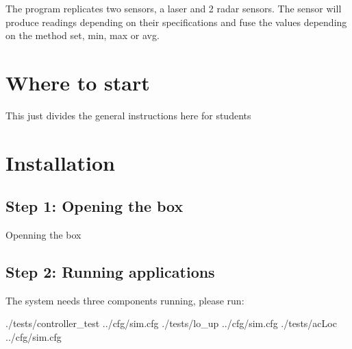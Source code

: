 The program replicates two sensors, a laser and 2 radar sensors. The sensor will produce readings depending on their specifications and fuse the values depending on the method set, min, max or avg.\hypertarget{index_ac_doc_index_more_info}{}\section{Where to start}\label{index_ac_doc_index_more_info}

\begin{DoxyItemize}
\item This just divides the general instructions here for students
\end{DoxyItemize}\hypertarget{index_ac_doc_install}{}\section{Installation}\label{index_ac_doc_install}
\hypertarget{index_ac_doc_step1}{}\subsection{Step 1\+: Opening the box}\label{index_ac_doc_step1}
Openning the box\hypertarget{index_ac_doc_step2}{}\subsection{Step 2\+: Running applications}\label{index_ac_doc_step2}
The system needs three components running, please run\+:

\begin{DoxyVerb}./tests/controller_test ../cfg/sim.cfg
./tests/lo_up ../cfg/sim.cfg
./tests/acLoc ../cfg/sim.cfg\end{DoxyVerb}
 
